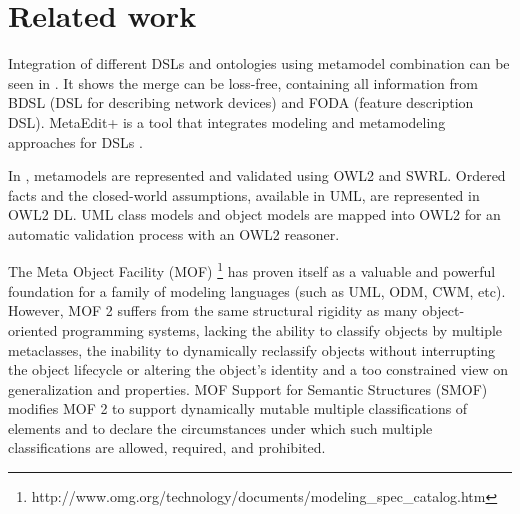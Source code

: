 \documentclass[[10pt,abbrv]{llncs}
\begin{document}
\section{Related work}

Integration of different DSLs and ontologies using metamodel combination can be seen in \cite{Walter2009}. It shows the merge can be loss-free, containing all information from BDSL (DSL for describing network devices) and FODA (feature description DSL). MetaEdit+ is a tool that integrates modeling and metamodeling approaches for DSLs \cite{Tolvanen2009}.

In \cite{Hoglund10}, metamodels are represented and validated using OWL2 and SWRL. Ordered facts and the closed-world assumptions, available in UML, are represented in OWL2 DL. UML class models and object models are mapped into OWL2 for an automatic validation process with an OWL2 reasoner. %


The Meta Object Facility (MOF) \footnote{http://www.omg.org/technology/documents/modeling\_spec\_catalog.htm} has proven itself as a valuable and powerful foundation for a family of modeling languages (such as UML, ODM, CWM, etc). However, MOF 2 suffers from the same structural rigidity as many object-oriented programming systems, lacking the ability to classify objects by multiple metaclasses, the inability to dynamically reclassify objects without interrupting the object lifecycle or altering the object's identity and a too constrained view on generalization and properties. MOF Support for Semantic Structures (SMOF) modifies MOF 2 to support dynamically mutable multiple classifications of elements and to declare the circumstances under which such multiple classifications are allowed, required, and prohibited. %

\end{document}

